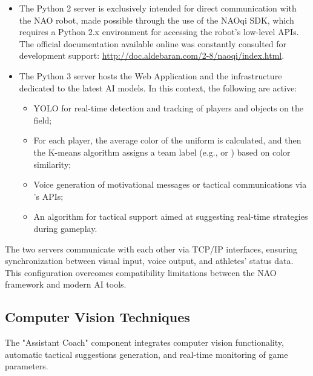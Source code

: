 \documentclass{optica-article}
\begin{document}
\begin{itemize}
 \item The Python 2 server is exclusively intended for direct communication with the NAO robot, made possible through the use of the NAOqi SDK, which requires a Python 2.x environment for accessing the robot's low-level APIs. The official documentation available online was constantly consulted for development support: \url{http://doc.aldebaran.com/2-8/naoqi/index.html}.

  \item The Python 3 server hosts the Web Application and the infrastructure dedicated to the latest AI models. In this context, the following are active:
  \begin{itemize}
    \item YOLO for real-time detection and tracking of players and objects on the field;
    \item For each player, the average color of the uniform is calculated, and then the K-means algorithm assigns a team label (e.g.,  or ) based on color similarity;
    \item Voice generation of motivational messages or tactical communications via 's  APIs;
    \item An algorithm for tactical support aimed at suggesting real-time strategies during gameplay.
  \end{itemize}
\end{itemize}

The two servers communicate with each other via TCP/IP interfaces, ensuring synchronization between visual input, voice output, and athletes' status data. This configuration overcomes compatibility limitations between the NAO framework and modern AI tools.

\subsection{Computer Vision Techniques}
The "Assistant Coach" component integrates computer vision functionality, automatic tactical suggestions generation, and real-time monitoring of game parameters.
\end{document}
